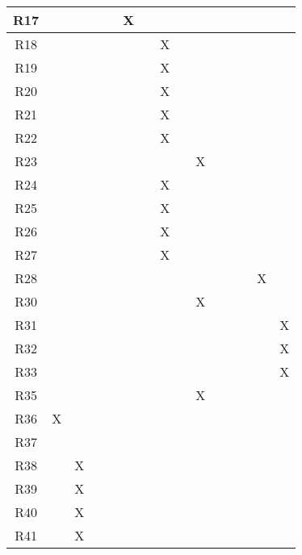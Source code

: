\begin{table}[]
\begin{tabular}{|c|c|c|c|c|c|c|c|c|c|c|c|c|c|c|}
R17       &    &    &    &    & X  &    &    &    &    &     &     &     &     &     \\ \hline
R18       &    &    &    &    &    &    & X  &    &    &     &     &     &     &     \\ \hline
R19       &    &    &    &    &    &    & X  &    &    &     &     &     &     &     \\ \hline
R20       &    &    &    &    &    &    & X  &    &    &     &     &     &     &     \\ \hline
R21       &    &    &    &    &    &    & X  &    &    &     &     &     &     &     \\ \hline
R22  &    &    &    &    &    &    & X  &    &    &     &     &     &     &     \\ \hline
R23       &    &    &    &    &    &    &    &    & X  &     &     &     &     &     \\ \hline
R24       &    &    &    &    &    &    & X  &    &    &     &     &     &     &     \\ \hline
R25       &    &    &    &    &    &    & X  &    &    &     &     &     &     &     \\ \hline
R26       &    &    &    &    &    &    & X  &    &    &     &     &     &     &     \\ \hline
R27       &    &    &    &    &    &    & X  &    &    &     &     &     &     &     \\ \hline
R28       &    &    &    &    &    &    &    &    &    &     &     &     & X   &     \\ \hline
R30       &    &    &    &    &    &    &    &    & X  &     &     &     &     &     \\ \hline
R31       &    &    &    &    &    &    &    &    &    &     &     &     &     & X   \\ \hline
R32       &    &    &    &    &    &    &    &    &    &     &     &     &     & X   \\ \hline
R33       &    &    &    &    &    &    &    &    &    &     &     &     &     & X   \\ \hline
R35       &    &    &    &    &    &    &    &    & X  &     &     &     &     &     \\ \hline
R36       & X  &    &    &    &    &    &    &    &    &     &     &     &     &     \\ \hline
R37       &    &    &    &    &    &    &    &    &    &     &     &     &     &     \\ \hline
R38       &    & X  &    &    &    &    &    &    &    &     &     &     &     &     \\ \hline
R39       &    & X  &    &    &    &    &    &    &    &     &     &     &     &     \\ \hline
R40       &    & X  &    &    &    &    &    &    &    &     &     &     &     &     \\ \hline
R41       &    & X  &    &    &    &    &    &    &    &     &     &     &     &     \\ \hline
\end{tabular}
\end{table}


